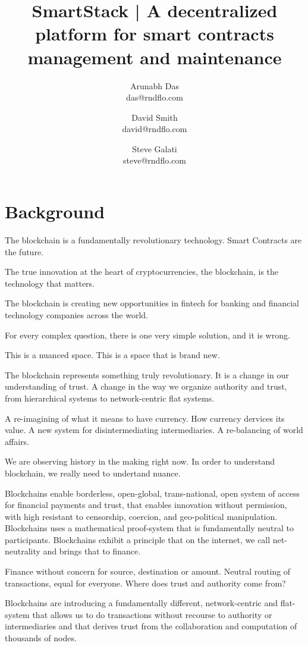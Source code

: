\documentclass{article}
\author{Arunabh Das \\ {das@rndflo.com}
   \and David Smith \\ {david@rndflo.com} 
   \and Steve Galati \\ {steve@rndflo.com} }
\title{SmartStack | A decentralized platform for smart contracts management and maintenance}
\date{\vspace{-5ex}}
\begin{document}
\maketitle

\section{Background}

The blockchain is a fundamentally revolutionary technology. Smart Contracts are the future. 

The true innovation at the heart of cryptocurrencies, the blockchain, is the technology that matters.

The blockchain is creating new opportunities in fintech for banking and financial technology companies  across the world.

For every complex question, there is one very simple solution, and it is wrong.

This is a nuanced space. This is a space that is brand new.

The blockchain represents something truly revolutionary. It is a change in our understanding of trust. A change in the way we organize
authority and trust, from hierarchical systems to network-centric flat systems. 

A re-imagining of what it means to have currency. How currency dervices its value. A new system for disintermediating intermediaries. 
A re-balancing of world affairs.

We are observing history in the making right now. In order to understand blockchain, we really need to undertand nuance. 

Blockchains enable borderless, open-global, trans-national, open system of access for financial payments and trust, that enables innovation
without permission, with high resistant to censorship, coercion, and geo-political manipulation. Blockchains uses a mathematical proof-system
that is fundamentally neutral to participants. Blockchains exhibit a principle that on the internet, we call net-neutrality and brings that to 
finance.

Finance without concern for source, destination or amount. Neutral routing of transactions, equal for everyone. Where does trust and 
authority come from?

Blockchains are introducing a fundamentally different, network-centric and flat-system that allows us to do transactions without 
recourse to authority or intermediaries and that derives trust from the collaboration and computation of thousands of nodes.
\end{document}
